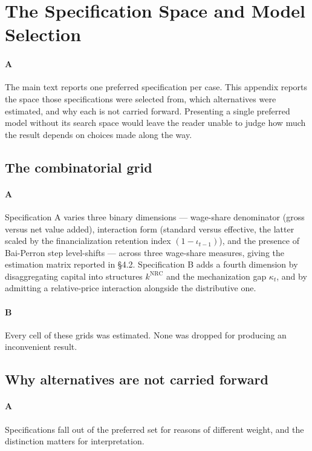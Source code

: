 \section{The Specification Space and Model Selection}

\paragraph{A}
The main text reports one preferred specification per case. This appendix reports the space those specifications were selected from, which alternatives were estimated, and why each is not carried forward. Presenting a single preferred model without its search space would leave the reader unable to judge how much the result depends on choices made along the way.

\subsection{The combinatorial grid}

\paragraph{A}
Specification A varies three binary dimensions — wage-share denominator (gross versus net value added), interaction form (standard versus effective, the latter scaled by the financialization retention index $(1-\iota_{t-1})$), and the presence of Bai-Perron step level-shifts — across three wage-share measures, giving the estimation matrix reported in §4.2. Specification B adds a fourth dimension by disaggregating capital into structures $k^{\text{NRC}}$ and the mechanization gap $\kappa_t$, and by admitting a relative-price interaction alongside the distributive one.

\paragraph{B}
Every cell of these grids was estimated. None was dropped for producing an inconvenient result.

\subsection{Why alternatives are not carried forward}

\paragraph{A}
Specifications fall out of the preferred set for reasons of different weight, and the distinction matters for interpretation.

